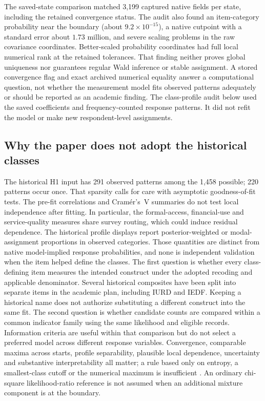 

The saved-state comparison matched 3,199 captured native fields per state, including the retained convergence status. The audit also found an item-category probability near the boundary (about $9.2\times 10^{-15}$), a native cutpoint with a standard error about $1.73$ million, and severe scaling problems in the raw covariance coordinates. Better-scaled probability coordinates had full local numerical rank at the retained tolerances. That finding neither proves global uniqueness nor guarantees regular Wald inference or stable assignment. A stored convergence flag and exact archived numerical equality answer a computational question, not whether the measurement model fits observed patterns adequately or should be reported as an academic finding. The class-profile audit below used the saved coefficients and frequency-counted response patterns. It did not refit the model or make new respondent-level assignments.



\subsection{Why the paper does not adopt the historical classes}
The historical H1 input has 291 observed patterns among the 1,458 possible; 220 patterns occur once. That sparsity calls for care with asymptotic goodness-of-fit tests. The pre-fit correlations and Cramér's~V summaries do not test local independence after fitting. In particular, the formal-access, financial-use and service-quality measures share survey routing, which could induce residual dependence. The historical profile displays report posterior-weighted or modal-assignment proportions in observed categories. Those quantities are distinct from native model-implied response probabilities, and none is independent validation when the item helped define the classes.
The first question is whether every class-defining item measures the intended construct under the adopted recoding and applicable denominator. Several historical composites have been split into separate items in the academic plan, including IURD and IEDF. Keeping a historical name does not authorize substituting a different construct into the same fit. The second question is whether candidate counts are compared within a common indicator family using the same likelihood and eligible records. Information criteria are useful within that comparison but do not select a preferred model across different response variables. Convergence, comparable maxima across starts, profile separability, plausible local dependence, uncertainty and substantive interpretability all matter; a rule based only on entropy, a smallest-class cutoff or the numerical maximum is insufficient \citep{nylundEtAl2007}. An ordinary chi-square likelihood-ratio reference is not assumed when an additional mixture component is at the boundary.

